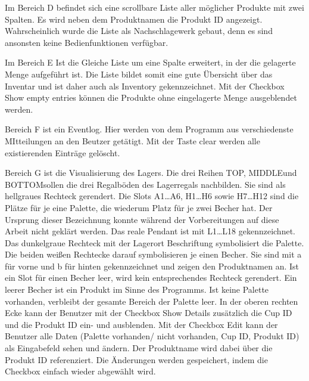 Im Bereich \glqq D \grqq befindet sich eine scrollbare Liste aller möglicher Produkte mit zwei Spalten.
Es wird neben dem Produktnamen die Produkt ID angezeigt.
Wahrscheinlich wurde die Liste als Nachschlagewerk gebaut, denn es sind ansonsten keine Bedienfunktionen verfügbar.

Im Bereich \glqq E \grqq Ist die Gleiche Liste um eine Spalte erweitert, in der die gelagerte Menge aufgeführt ist.
Die Liste bildet somit eine gute Übersicht über das Inventar und ist daher auch als \glqq Inventory \grqq gekennzeichnet.
Mit der Checkbox \glqq Show empty entries \grqq können die Produkte ohne eingelagerte Menge ausgeblendet werden.

Bereich \glqq F \grqq ist ein Eventlog. Hier werden von dem Programm aus verschiedenste MItteilungen an den Beutzer getätigt.
Mit der Taste \glqq clear \grqq werden alle existierenden Einträge gelöscht.

Bereich \glqq G \grqq ist die Visualisierung des Lagers.
Die drei Reihen \glqq TOP\grqq, \glqq MIDDLE\grqq und \glqq BOTTOM\grqq sollen die drei Regalböden des Lagerregals nachbilden.
Sie sind als hellgraues Rechteck gerendert.
Die Slots A1\ldots A6, H1\ldots H6 sowie H7\ldots H12 sind die Plätze für je eine Palette, die wiederum Platz für
je zwei Becher hat.
Der Ursprung dieser Bezeichnung konnte während der Vorbereitungen auf diese Arbeit nicht geklärt werden.
Das reale Pendant ist mit L1\ldots L18 gekennzeichnet.\\
Das dunkelgraue Rechteck mit der Lagerort Beschriftung symbolisiert die Palette.
Die beiden weißen Rechtecke darauf symbolisieren je einen Becher.
Sie sind mit \glqq a \grqq für vorne und \glqq b \grqq für hinten gekennzeichnet und zeigen den Produktnamen an.
Ist ein Slot für einen Becher leer, wird kein entsprechendes Rechteck gerendert.
Ein leerer Becher ist ein Produkt im Sinne des Programms.
Ist keine Palette vorhanden, verbleibt der gesamte Bereich der Palette leer.
In der oberen rechten Ecke kann der Benutzer mit der Checkbox \glqq Show Details \grqq zusätzlich die Cup ID und die
Produkt ID ein- und ausblenden.
Mit der Checkbox \glqq Edit \grqq kann der Benutzer alle Daten (Palette vorhanden/ nicht vorhanden, Cup ID, Produkt ID)
als Eingabefeld sehen und ändern.
Der Produktname wird dabei über die Produkt ID referenziert.
Die Änderungen werden gespeichert, indem die Checkbox einfach wieder abgewählt wird.\\

